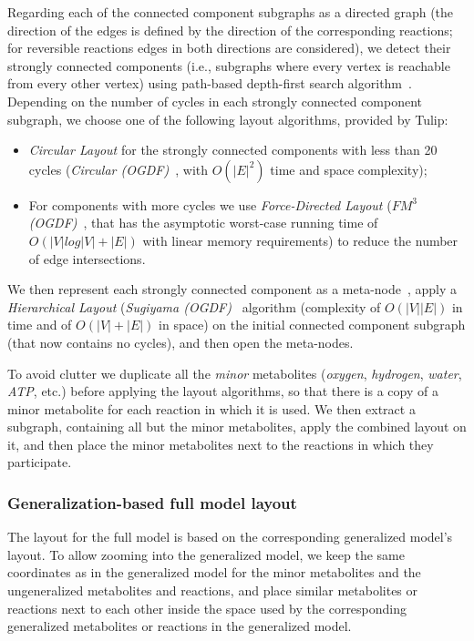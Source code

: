 \documentclass{bmcart}
\begin{document}
Regarding each of the connected component subgraphs as a directed graph (the direction of the edges is defined by the direction of the corresponding reactions; for reversible reactions edges in both directions are considered), we detect their strongly connected components (i.e., subgraphs where every vertex is reachable from every other vertex) using path-based depth-first search algorithm~\cite{Gabow2000}. Depending on the number of cycles in each strongly connected component subgraph, we choose one of the following layout algorithms, provided by Tulip:
\begin{itemize}
\item \emph{Circular Layout} for the strongly connected components with less than 20 cycles (\emph{Circular (OGDF)}~\cite{Tamassia:2007:HGD:1202383}, with $O(|E|^2)$ time and space complexity);
\item For components with more cycles we use \emph{Force-Directed Layout} (\emph{$FM^3$ (OGDF)}~\cite{Hachul2005}, that has the asymptotic worst-case running time of $O(|V|log|V|+|E|)$ with linear memory requirements) to reduce the number of edge intersections.
\end{itemize}
We then represent each strongly connected component as a meta-node~\cite{Auber04}, apply a \emph{Hierarchical Layout} (\emph{Sugiyama (OGDF)}~\cite{Sugiyama1981} algorithm (complexity of $O(|V||E|)$ in time and of $O(|V| + |E|)$ in space) on the initial connected component subgraph (that now contains no cycles), and then open the meta-nodes.

To avoid clutter we duplicate all the \emph{minor} metabolites (\textit{oxygen}, \textit{hydrogen}, \textit{water}, \textit{ATP}, etc.) before applying the layout algorithms, so that there is a copy of a minor metabolite for each reaction in which it is used. We then extract a subgraph, containing all but the minor metabolites, apply the combined layout on it, and then place the minor metabolites next to the reactions in which they participate. 

\subsubsection*{Generalization-based full model layout}
The layout for the full model is based on the corresponding generalized model's layout. To allow zooming into the generalized model, we keep the same coordinates as in the generalized model for the minor metabolites and the ungeneralized metabolites and reactions, and place similar metabolites or reactions next to each other inside the space used by the corresponding generalized metabolites or reactions in the generalized model. 
\end{document}
